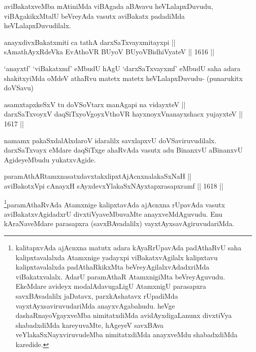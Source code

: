 \begin{artha}
aviBakatxveMba mAtiniMda viBAgada aBAvavu heVLalapxDuvudu, viBAgakikxMtalU beVreyAda vasutx aviBakatx padadiMda heVLalapxDuvudilalx.
\end{artha}


\begin{shl}
anayxdivxBakatxmiti ca tathA darxSaTxvayxmitayxpi || \\
sAmathAyxRdeVka EvAthoVR BUyoV BUyoV\s BidhiVyateV \hfill || 1616 ||  
\end{shl}

\begin{artha}
`anayxtf' `viBakatxmf' eMbudU hAgU `darxSaTxvayxmf' eMbudU saha adara shakitxyiMda oMdeV athaRvu matetx matetx heVLalapxDuvudu- (punarukitx doVSavu)
\end{artha}


\begin{shl}
asamxtapxkeSxV tu doVSoV\s tarx manAgapi na vidayxteV || \\
darxSaTxvoyxV daqSiTxyoVgoyxV\s thoVR hayxnoyxV\s nanayxshacx yujayxteV \hfill || 1617 ||  
\end{shl}

\begin{artha}
namamx pakaSxdalAlxdaroV idaralilx savxlapxvU doVSaviruvudilalx. darxSaTxvayx eMdare daqSiTxge ahaRvAda vasutx adu BinanxvU aBinanxvU AgideyeMbudu yukatxvAgide.
\end{artha}


\begin{shl}
paramAthARtamxnasatxdavxtakxlipxtAjAcnxnalakaSxNaH ||  \\
aviBakotxV\s pi cAnayxH sAyxdevxYlakaSxNAyxtapxrasapxramf \hfill || 1618 ||  
\end{shl}

\begin{artha}
\footnote{kalitapxvAda ajAcnxna matutx adara kAyaRrUpavAda padAthaRvU saha kalipxtavalalxda Atamxnige yadayxpi viBakatxvAgilalx kalipxtavu kalipxtavalalxda padAthaRkikxMta beVreyAgilalxvAdadxriMda viBakatxvalalx. AdarU paramAthaR AtamxnigiMta beVreyAguvudu. EkeMdare avideyx modalAdavugaLigU AtamxnigU parasapxra savxBAvadalilx jaDatavx, parxkAshatavx rUpadiMda vayxtAyxsaviruvudariMda anayxvAgabahudu. heVge dashaRnayoVgayxveMba nimitatxdiMda avidAyxdigaLanunx divxtiVya shabadxdiMda kareyuvaMte, hAgeyeV savxBAva veYlakaSxNayxviruvudeMba nimitatxdiMda anayxveMdu shabadxdiMda karedide.}paramAthaRvAda Atamxnige kalipxtavAda ajAcnxna rUpavAda vasutx aviBakatxvAgidadxrU divxtiVyaveMbuvaMte anayxveMdAguvudu. Enu kAraNaveMdare parasapxra (savxBAvadalilx) vayxtAyxsavAgiruvudariMda.
\end{artha}

